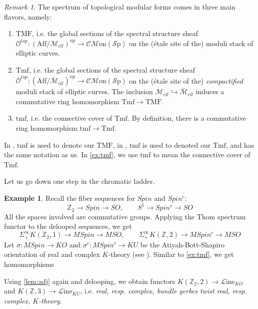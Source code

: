 \documentclass[a4paper]{book}
\newcommand{\lC}{\mathcal{C}}
\newcommand{\lL}{\mathcal{L}}
\newcommand{\lM}{\mathcal{M}}
\newcommand{\rO}{\mathscr{O}}
\newcommand{\lS}{\mathcal{S}}
\newcommand{\bZ}{\mathbb{Z}}
\newcommand{\op}{\mathrm{op}}
\newcommand{\Sp}{\lS\mathrm{p}} %
\newcommand{\Mon}{\lM\mathrm{on}} %
\newcommand{\CMon}{\lC\Mon} %
\renewcommand{\Line}{\lL\mathrm{ine}} %
\theoremstyle{definition}
\newtheorem{example}[equation]{Example}
\theoremstyle{remark}
\newtheorem{remark}[equation]{Remark}
\numberwithin{equation}{section}
\begin{document}
\begin{remark}\label{rmk:names}The spectrum of topological modular forms comes in three main flavors, namely:
\begin{enumerate}
	\item $\mathrm{TMF}$, i.e. the global sections of the spectral structure sheaf $\rO^{top}:(\mathrm{Aff}/\lM_{ell})^{\op}\to\CMon(\Sp)$ on the (\' etale site of the) moduli stack of elliptic curves.
	\item $\mathrm{Tmf}$, i.e. the global sections of the spectral structure sheaf $\bar{\rO}^{top}:(\mathrm{Aff}/\bar{\lM}_{ell})^{\op}\to\CMon(\Sp)$ on the (\' etale site of the) \emph{compactified} moduli stack of elliptic curves. The inclusion $\lM_{ell}\hookrightarrow\bar{\lM}_{ell}$ induces a commutative ring homomorphism $\mathrm{Tmf}\to\mathrm{TMF}$.
	\item $\mathrm{tmf}$, i.e. the connective cover of $\mathrm{Tmf}$. By definition, there is a commutative ring homomorphism $\mathrm{tmf}\to\mathrm{Tmf}$. 
\end{enumerate}In \cite{ando2010multiplicative}, $\mathrm{tmf}$ is used to denote our $\mathrm{TMF}$, in \cite{goerss2009topologicalmodularformsaftern}, $\mathrm{tmf}$ is used to denoted our $\mathrm{Tmf}$, and \cite{douglas2014topological} has the same notation as us. In \cref{ex:tmf}, we use $\mathrm{tmf}$ to mean the connective cover of $\mathrm{Tmf}$. 
\end{remark}
Let us go down one step in the chromatic ladder. 
\begin{example}\label{ex:ktheory}
	Recall the fiber sequences for $Spin$ and $Spin^c$: \[\bZ_2\to Spin\to SO,\qquad S^1\to Spin^c\to SO\] All the spaces involved are commutative groups. Applying the Thom spectrum functor to the delooped sequences, we get\[\Sigma^\infty_+K(\bZ_2,1)\to MSpin\to MSO,\qquad\Sigma^\infty_+K(\bZ,2)\to MSpin^c\to MSO \]
	Let $\sigma:MSpin\to KO$ and $\sigma^c:MSpin^c\to KU$ be the Atiyah-Bott-Shapiro orientation of real and complex $K$-theory (see \cite{atiyahbottshapiro1964clifford}).
	Similar to \cref{ex:tmf}, we get homomorphisms 
	\begin{center}
	\end{center}
	Using \cref{lem:adj} again and delooping, we obtain functors $K(\bZ_2,2)\to\Line_{KO}$ and $K(\bZ,3)\to \Line_{KU}$, i.e. \emph{real, resp. complex, bundle gerbes twist real, resp. complex, $K$-theory}. 
\end{example}
\end{document}
